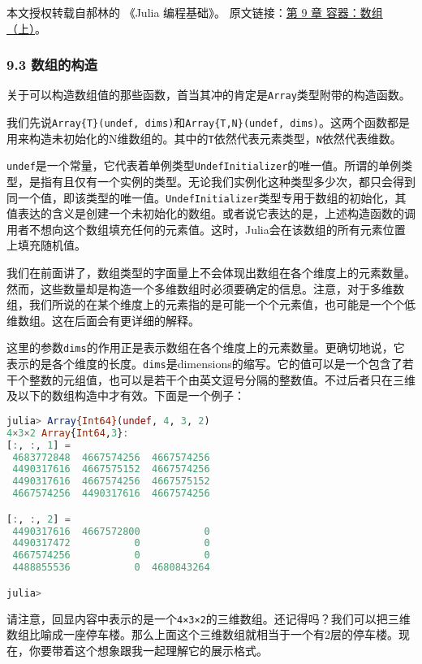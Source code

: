 
本文授权转载自郝林的 《Julia 编程基础》。 原文链接：\href{https://github.com/hyper0x/JuliaBasics/blob/master/book/ch09.md}{第 9 章 容器：数组（上）}。


\subsubsection{9.3 数组的构造}

关于可以构造数组值的那些函数，首当其冲的肯定是\verb|Array|类型附带的构造函数。

我们先说\verb|Array{T}(undef, dims)|和\verb|Array{T,N}(undef, dims)|。这两个函数都是用来构造未初始化的N维数组的。其中的\verb|T|依然代表元素类型，\verb|N|依然代表维数。

\verb|undef|是一个常量，它代表着单例类型\verb|UndefInitializer|的唯一值。所谓的单例类型，是指有且仅有一个实例的类型。无论我们实例化这种类型多少次，都只会得到同一个值，即该类型的唯一值。\verb|UndefInitializer|类型专用于数组的初始化，其值表达的含义是创建一个未初始化的数组。或者说它表达的是，上述构造函数的调用者不想向这个数组填充任何的元素值。这时，Julia会在该数组的所有元素位置上填充随机值。

我们在前面讲了，数组类型的字面量上不会体现出数组在各个维度上的元素数量。然而，这些数量却是构造一个多维数组时必须要确定的信息。注意，对于多维数组，我们所说的在某个维度上的元素指的是可能一个个元素值，也可能是一个个低维数组。这在后面会有更详细的解释。

这里的参数\verb|dims|的作用正是表示数组在各个维度上的元素数量。更确切地说，它表示的是各个维度的长度。\verb|dims|是dimensions的缩写。它的值可以是一个包含了若干个整数的元组值，也可以是若干个由英文逗号分隔的整数值。不过后者只在三维及以下的数组构造中才有效。下面是一个例子：

\begin{lstlisting}[language=julia]
julia> Array{Int64}(undef, 4, 3, 2)
4×3×2 Array{Int64,3}:
[:, :, 1] =
 4683772848  4667574256  4667574256
 4490317616  4667575152  4667574256
 4490317616  4667574256  4667575152
 4667574256  4490317616  4667574256

[:, :, 2] =
 4490317616  4667572800           0
 4490317472           0           0
 4667574256           0           0
 4488855536           0  4680843264

julia> 
\end{lstlisting}

请注意，回显内容中表示的是一个\verb|4×3×2|的三维数组。还记得吗？我们可以把三维数组比喻成一座停车楼。那么上面这个三维数组就相当于一个有2层的停车楼。现在，你要带着这个想象跟我一起理解它的展示格式。

